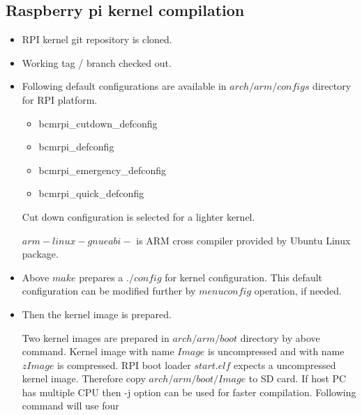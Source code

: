 \subsection {Raspberry pi kernel compilation}
\begin{itemize}
	\item RPI kernel git repository is cloned.\par
		 \par
	\item Working tag / branch checked out.\par
		 \par
	\item Following default configurations are available in
		$arch/arm/configs$ directory for RPI platform. 
		\begin{itemize}
			\item bcmrpi\_cutdown\_defconfig
			\item bcmrpi\_defconfig
			\item bcmrpi\_emergency\_defconfig
			\item bcmrpi\_quick\_defconfig
		\end{itemize}
		Cut down configuration is selected for a lighter
		kernel.\par
		 \par
		$arm-linux-gnueabi-$ is ARM cross compiler provided by Ubuntu Linux package.  
	\item Above $make$ prepares a $./config$ for kernel configuration.
		This default configuration can be modified further by
		$menuconfig$ operation, if needed.\par
		 \par
	\item Then the kernel image is prepared.\par
		 \par
		Two kernel images are prepared in $arch/arm/boot$ directory by
		above command. Kernel image with name $Image$ is
		uncompressed and with name $zImage$ is compressed. RPI
		boot loader $start.elf$ expects a uncompressed kernel
		image. Therefore copy $arch/arm/boot/Image$ to SD card.
		If host PC has multiple CPU then -j option can be used
		for faster compilation. Following command will use four

\end{itemize}
